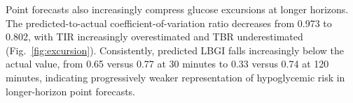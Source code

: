 \documentclass[journal]{IEEEtran}
\begin{document}
Point forecasts also increasingly compress glucose excursions at longer horizons. The predicted-to-actual coefficient-of-variation ratio decreases from 0.973 to 0.802, with TIR increasingly overestimated and TBR underestimated (Fig.~\ref{fig:excursion}). Consistently, predicted LBGI falls increasingly below the actual value, from 0.65 versus 0.77 at 30 minutes to 0.33 versus 0.74 at 120 minutes, indicating progressively weaker representation of hypoglycemic risk in longer-horizon point forecasts.

\of\summarytable \global\let\tirActA=\pgfplotsretval
{}\of\summarytable \global\let\tirActB=\pgfplotsretval
{}\of\summarytable \global\let\tirActC=\pgfplotsretval
{}\of\summarytable \global\let\tirActD=\pgfplotsretval
{}\of\summarytable \global\let\tirPredA=\pgfplotsretval
{}\of\summarytable \global\let\tirPredB=\pgfplotsretval
{}\of\summarytable \global\let\tirPredC=\pgfplotsretval
{}\of\summarytable \global\let\tirPredD=\pgfplotsretval
{}\of\summarytable \global\let\tbrActA=\pgfplotsretval
{}\of\summarytable \global\let\tbrActB=\pgfplotsretval
{}\of\summarytable \global\let\tbrActC=\pgfplotsretval
{}\of\summarytable \global\let\tbrActD=\pgfplotsretval
{}\of\summarytable \global\let\tbrPredA=\pgfplotsretval
{}\of\summarytable \global\let\tbrPredB=\pgfplotsretval
{}\of\summarytable \global\let\tbrPredC=\pgfplotsretval
{}\of\summarytable \global\let\tbrPredD=\pgfplotsretval
{}\of\summarytable \global\let\cvA=\pgfplotsretval
{}\of\summarytable \global\let\cvB=\pgfplotsretval
{}\of\summarytable \global\let\cvC=\pgfplotsretval
{}\of\summarytable \global\let\cvD=\pgfplotsretval
\end{document}
